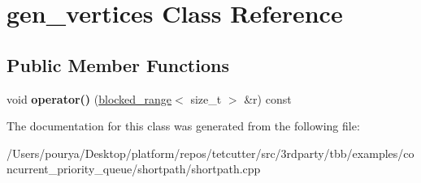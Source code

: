 \hypertarget{classgen__vertices}{}\section{gen\+\_\+vertices Class Reference}
\label{classgen__vertices}
\subsection*{Public Member Functions}
\begin{DoxyCompactItemize}
\item 
\hypertarget{classgen__vertices_a5bdbee403ead73ae37bbe5438d36cd95}{}void {\bfseries operator()} (\hyperlink{classtbb_1_1blocked__range}{blocked\+\_\+range}$<$ size\+\_\+t $>$ \&r) const \label{classgen__vertices_a5bdbee403ead73ae37bbe5438d36cd95}

\end{DoxyCompactItemize}


The documentation for this class was generated from the following file\+:\begin{DoxyCompactItemize}
\item 
/\+Users/pourya/\+Desktop/platform/repos/tetcutter/src/3rdparty/tbb/examples/concurrent\+\_\+priority\+\_\+queue/shortpath/shortpath.\+cpp\end{DoxyCompactItemize}
